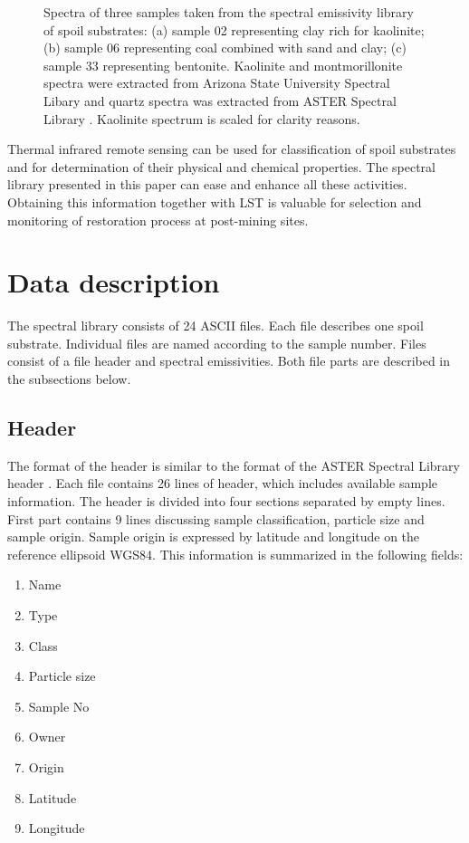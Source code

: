 \begin{appendices}
\begin{figure}[!t]
\begin{subfigure}[t]{.3\linewidth}
		\caption{}
	\end{subfigure}
	\vspace{1.5 em}
	\caption{Spectra of three samples taken from the spectral emissivity library of spoil substrates: (a) sample 02 representing clay rich for kaolinite; (b) sample 06 representing coal combined with sand and clay; (c) sample 33 representing bentonite. Kaolinite and montmorillonite spectra were extracted from Arizona State University Spectral Libary \cite{CB00} and quartz spectra was extracted from ASTER Spectral Library \cite{BH09}. Kaolinite spectrum is scaled for clarity reasons.}
	\label{fig:SpectraPreview}
\end{figure}

Thermal infrared remote sensing can be used for classification of spoil substrates and for determination of their physical and chemical properties. The spectral library presented in this paper can ease and enhance all these activities. Obtaining this information together with LST is valuable for selection and monitoring of restoration process at post-mining sites. 

\section{Data description}

The spectral library consists of 24 ASCII files. Each file describes one spoil substrate. Individual files are named according to the sample number. Files consist of a file header and spectral emissivities. Both file parts are described in the subsections below.

\subsection{Header}

The format of the header is similar to the format of the ASTER Spectral Library header \cite{BH09}. Each file contains 26 lines of header, which includes available sample information. The header is divided into four sections separated by empty lines. First part contains 9 lines discussing sample classification, particle size and sample origin. Sample origin is expressed by latitude and longitude on the reference ellipsoid WGS84. This information is summarized in the following fields:

\begin{enumerate}
	\item	Name
	\item Type
	\item Class
	\item Particle size
	\item Sample No
	\item Owner
	\item Origin
	\item Latitude
	\item Longitude
\end{enumerate}


\end{appendices}
